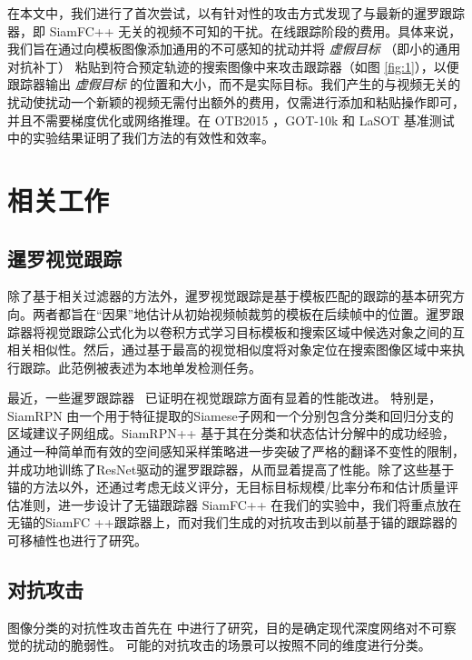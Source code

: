 在本文中，我们进行了首次尝试，以有针对性的攻击方式发现了与最新的暹罗跟踪器，即 SiamFC++ \cite{SiamFC++}无关的视频不可知的干扰。在线跟踪阶段的费用。具体来说，我们旨在通过向模板图像添加通用的不可感知的扰动并将 \textit{虚假目标} （即小的通用对抗补丁） 粘贴到符合预定轨迹的搜索图像中来攻击跟踪器（如图 \ref{fig:1}），以便跟踪器输出 \textit{虚假目标} 的位置和大小，而不是实际目标。我们产生的与视频无关的扰动使扰动一个新颖的视频无需付出额外的费用，仅需进行添加和粘贴操作即可，并且不需要梯度优化或网络推理。在 OTB2015 \cite{OTB}，GOT-10k \cite{GOT-10k} 和 LaSOT \cite{LaSOT} 基准测试中的实验结果证明了我们方法的有效性和效率。

\section{相关工作}

\subsection{暹罗视觉跟踪}

除了基于相关过滤器的方法外，暹罗视觉跟踪是基于模板匹配的跟踪的基本研究方向。两者都旨在“因果”地估计从初始视频帧裁剪的模板在后续帧中的位置。暹罗跟踪器将视觉跟踪公式化为以卷积方式学习目标模板和搜索区域中候选对象之间的互相关相似性。然后，通过基于最高的视觉相似度将对象定位在搜索图像区域中来执​​行跟踪。此范例被表述为本地单发检测任务。

最近，一些暹罗跟踪器~\cite{SiamRPN,SiamRPN++,SiamFC++} 已证明在视觉跟踪方面有显着的性能改进。
特别是，SiamRPN \cite{SiamRPN} 由一个用于特征提取的Siamese子网和一个分别包含分类和回归分支的区域建议子网组成。SiamRPN++ \cite{SiamRPN++} 基于其在分类和状态估计分解中的成功经验，通过一种简单而有效的空间感知采样策略进一步突破了严格的翻译不变性的限制，并成功地训练了ResNet驱动的暹罗跟踪器，从而显着提高了性能。除了这些基于锚的方法以外，还通过考虑无歧义评分，无目标目标规模/比率分布和估计质量评估准则​​，进一步设计了无锚跟踪器 SiamFC++ \cite{SiamFC++} 在我们的实验中，我们将重点放在无锚的SiamFC ++跟踪器上，而对我们生成的对抗攻击到以前基于锚的跟踪器的可移植性也进行了研究。

\subsection{对抗攻击}

图像分类的对抗性攻击首先在 \cite{intriguing}中进行了研究，目的是确定现代深度网络对不可察觉的扰动的脆弱性。
可能的对抗攻击的场景可以按照不同的维度进行分类。

